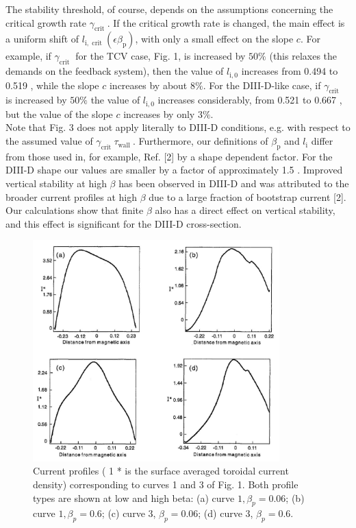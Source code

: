 \documentclass[utf8]{ctexart}
\begin{document}
\begin{sloppypar}
 The stability threshold, of course, depends on the assumptions concerning the critical growth rate $\gamma_{\text {crit }}$. If the critical growth rate is changed, the main effect is a uniform shift of $l_{\mathrm{i}, \text { crit }}\left(\epsilon \beta_{\mathrm{p}}\right)$, with only a small effect on the slope $c$. For example, if $\gamma_{\text {crit }}$ for the TCV case, Fig. 1, is increased by $50 \%$ (this relaxes the demands on the feedback system), then the value of $l_{\mathrm{i}, 0}$ increases from 0.494 to 0.519 , while the slope $c$ increases by about $8 \%$. For the DIII-D-like case, if $\gamma_{\text {crit }}$ is increased by $50 \%$ the value of $l_{\mathrm{i}, 0}$ increases considerably, from 0.521 to 0.667 , but the value of the slope $c$ increases by only $3 \%$.\\ Note that Fig. 3 does not apply literally to DIII-D conditions, e.g. with respect to the assumed value of $\gamma_{\text {crit }} \tau_{\text {wall }}$. Furthermore, our definitions of $\beta_{\mathrm{p}}$ and $l_{\mathrm{i}}$ differ from those used in, for example, Ref. [2] by a shape dependent factor. For the DIII-D shape our values are smaller by a factor of approximately 1.5 . Improved vertical stability at high $\beta$ has been observed in DIII-D and was attributed to the broader current profiles at high $\beta$ due to a large fraction of bootstrap current [2]. Our calculations show that finite $\beta$ also has a direct effect on vertical stability, and this effect is significant for the DIII-D cross-section.
 \begin{figure}[H]
 	\centering
 	\includegraphics[max width=0.85\textwidth,max height=0.35\textheight]{2025_01_10_a0135324997886412d98g-4}
 	\caption{Current profiles ( 1 * is the surface averaged toroidal current density) corresponding to curves 1 and 3 of Fig. 1. Both profile types are shown at low and high beta: (a) curve $1, \beta_{p}=0.06$; (b) curve $1, \beta_{p}=0.6$; (c) curve 3, $\beta_{p}=0.06$; (d) curve 3, $\beta_{p}=0.6$.}
 	\label{fig2.}
 \end{figure}
 

\end{sloppypar}
\end{document}
